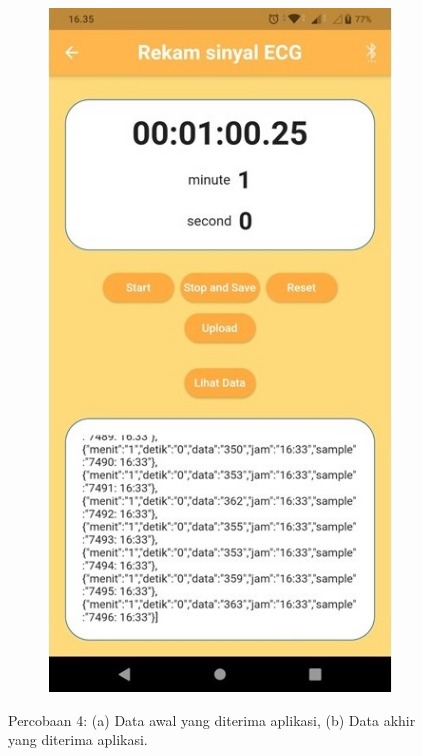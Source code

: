 \begin{figure}[H]
	\begin{subfigure}{0.45\textwidth}
		\centering
		\includegraphics[width=1\linewidth]{img/percob/Slide14b.jpg}	  
		\caption{}		
	\end{subfigure}
	\caption{Percobaan 4: (a) Data awal yang diterima aplikasi, (b) Data akhir yang diterima aplikasi.}
	\label{fig:4.2.6}
\end{figure}
